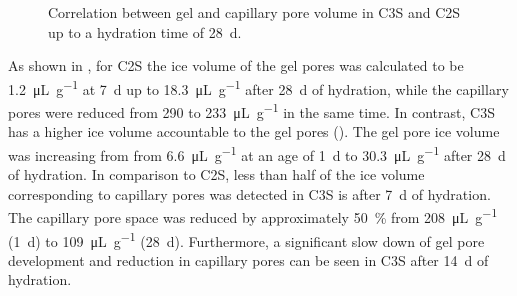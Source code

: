 \begin{figure}[htb]
    \centering


    \caption{
		Correlation between gel and capillary pore volume in \ac{C3S} and \ac{C2S} up to a hydration time of \qty{28}{\day}.
	}
	\label{fig:ltdsc_result_melt_correlation}
\end{figure}



As shown in , for \ac{C2S} the ice volume of the gel pores was calculated to be \qty{1.2}{\micro\liter\per\gram} at \qty{7}{\day} up to \qty{18.3}{\micro\liter\per\gram} after \qty{28}{\day} of hydration, while the capillary pores were reduced from \num{290} to \qty{233}{\micro\liter\per\gram} in the same time.
In contrast, \ac{C3S} has a higher ice volume accountable to the gel pores ().
The gel pore ice volume was increasing from from \qty{6.6}{\micro\liter\per\gram} at an age of \qty{1}{\day} to \qty{30.3}{\micro\liter\per\gram} after \qty{28}{\day} of hydration.
In comparison to \ac{C2S}, less than half of the ice volume corresponding to capillary pores was detected in \ac{C3S} is after \qty{7}{\day} of hydration.
The capillary pore space was reduced by approximately  \qty{50}{\percent} from \qty{208}{\micro\liter\per\gram} (\qty{1}{\day}) to \qty{109}{\micro\liter\per\gram} (\qty{28}{\day}).
Furthermore, a significant slow down of gel pore development and reduction in capillary pores can be seen in \ac{C3S} after \qty{14}{\day} of hydration.

